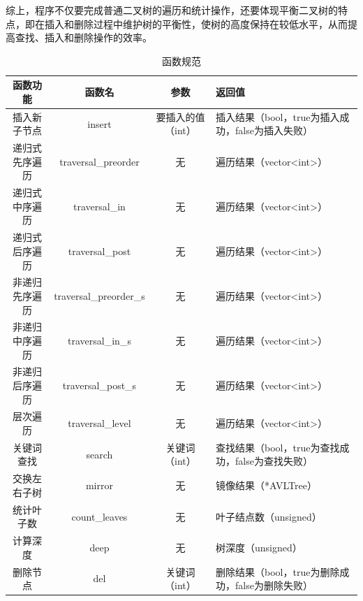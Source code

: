 \documentclass[a4paper, 12pt, oneside]{article}
\theoremstyle{cn_theorem}
\begin{document}
综上，程序不仅要完成普通二叉树的遍历和统计操作，还要体现平衡二叉树的特点，即在插入和删除过程中维护树的平衡性，使树的高度保持在较低水平，从而提高查找、插入和删除操作的效率。
\clearpage
\begin{table}[htbp]
    \centering
    \caption{函数规范}
    \label{tab:funs}
    \begin{center}
        \begin{tabularx}{\textwidth}{|c|c|c|X|}
            \toprule
            函数功能    & 函数名                    & 参数         & 返回值                                      \\ \hline
            \midrule
            插入新子节点  & insert                 & 要插入的值（int） & 插入结果（bool，true为插入成功，false为插入失败）          \\
            递归式先序遍历 & traversal\_preorder    & 无          & 遍历结果（vector\textless{}int\textgreater{}） \\
            递归式中序遍历 & traversal\_in          & 无          & 遍历结果（vector\textless{}int\textgreater{}） \\
            递归式后序遍历 & traversal\_post        & 无          & 遍历结果（vector\textless{}int\textgreater{}） \\
            非递归先序遍历 & traversal\_preorder\_s & 无          & 遍历结果（vector\textless{}int\textgreater{}） \\
            非递归中序遍历 & traversal\_in\_s       & 无          & 遍历结果（vector\textless{}int\textgreater{}） \\
            非递归后序遍历 & traversal\_post\_s     & 无          & 遍历结果（vector\textless{}int\textgreater{}） \\
            层次遍历    & traversal\_level       & 无          & 遍历结果（vector\textless{}int\textgreater{}） \\
            关键词查找   & search                 & 关键词（int）   & 查找结果（bool，true为查找成功，false为查找失败）          \\
            交换左右子树  & mirror                 & 无          & 镜像结果（*AVLTree）                           \\
            统计叶子数   & count\_leaves          & 无          & 叶子结点数（unsigned）                          \\
            计算深度    & deep                   & 无          & 树深度（unsigned）                            \\
            删除节点    & del                    & 关键词（int）   & 删除结果（bool，true为删除成功，false为删除失败）          \\
            \bottomrule
        \end{tabularx}

    \end{center}
\end{table}
\end{document}

